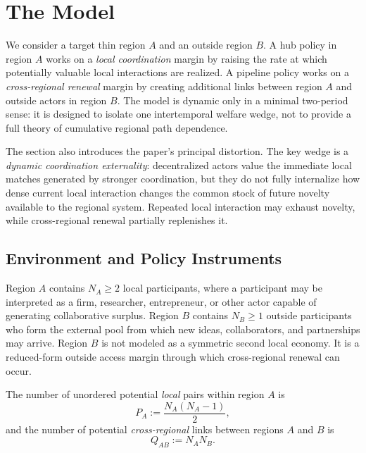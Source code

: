 \section{The Model}
\label{sec:model}

We consider a target thin region $A$ and an outside region $B$. A hub policy in region $A$ works on a \emph{local coordination} margin by raising the rate at which potentially valuable local interactions are realized. A pipeline policy works on a \emph{cross-regional renewal} margin by creating additional links between region $A$ and outside actors in region $B$. The model is dynamic only in a minimal two-period sense: it is designed to isolate one intertemporal welfare wedge, not to provide a full theory of cumulative regional path dependence.

The section also introduces the paper's principal distortion. The key wedge is a \emph{dynamic coordination externality}: decentralized actors value the immediate local matches generated by stronger coordination, but they do not fully internalize how dense current local interaction changes the common stock of future novelty available to the regional system. Repeated local interaction may exhaust novelty, while cross-regional renewal partially replenishes it.

\subsection{Environment and Policy Instruments}

Region $A$ contains $N_A\ge 2$ local participants, where a participant may be interpreted as a firm, researcher, entrepreneur, or other actor capable of generating collaborative surplus. Region $B$ contains $N_B\ge 1$ outside participants who form the external pool from which new ideas, collaborators, and partnerships may arrive. Region $B$ is not modeled as a symmetric second local economy. It is a reduced-form outside access margin through which cross-regional renewal can occur.

The number of unordered potential \emph{local} pairs within region $A$ is
\begin{equation}
P_A:=\frac{N_A(N_A-1)}{2},
\label{eq:pair_count}
\end{equation}
and the number of potential \emph{cross-regional} links between regions $A$ and $B$ is
\begin{equation}
Q_{AB}:=N_A N_B.
\label{eq:cross_pair_count}
\end{equation}


